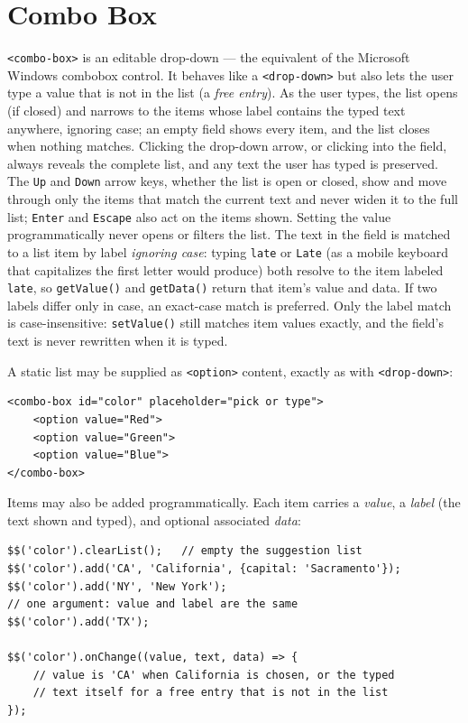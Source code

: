 \section{Combo Box}
\label{sec:comp-combobox}

\texttt{<combo-box>} is an editable drop-down --- the equivalent of the Microsoft Windows combobox control.  It behaves like a \texttt{<drop-down>} but also lets the user type a value that is not in the list (a \emph{free entry}).  As the user types, the list opens (if closed) and narrows to the items whose label contains the typed text anywhere, ignoring case; an empty field shows every item, and the list closes when nothing matches.  Clicking the drop-down arrow, or clicking into the field, always reveals the complete list, and any text the user has typed is preserved.  The \texttt{Up} and \texttt{Down} arrow keys, whether the list is open or closed, show and move through only the items that match the current text and never widen it to the full list; \texttt{Enter} and \texttt{Escape} also act on the items shown.  Setting the value programmatically never opens or filters the list.  The text in the field is matched to a list item by label \emph{ignoring case}: typing \texttt{late} or \texttt{Late} (as a mobile keyboard that capitalizes the first letter would produce) both resolve to the item labeled \texttt{late}, so \texttt{getValue()} and \texttt{getData()} return that item's value and data.  If two labels differ only in case, an exact-case match is preferred.  Only the label match is case-insensitive: \texttt{setValue()} still matches item values exactly, and the field's text is never rewritten when it is typed.

A static list may be supplied as \texttt{<option>} content, exactly as with \texttt{<drop-down>}:

\begin{lstlisting}[style=html]
<combo-box id="color" placeholder="pick or type">
    <option value="Red">
    <option value="Green">
    <option value="Blue">
</combo-box>
\end{lstlisting}

\noindent
Items may also be added programmatically.  Each item carries a \emph{value}, a \emph{label} (the text shown and typed), and optional associated \emph{data}:

\begin{lstlisting}[style=javascript]
$$('color').clearList();   // empty the suggestion list
$$('color').add('CA', 'California', {capital: 'Sacramento'});
$$('color').add('NY', 'New York');
// one argument: value and label are the same
$$('color').add('TX');

$$('color').onChange((value, text, data) => {
    // value is 'CA' when California is chosen, or the typed
    // text itself for a free entry that is not in the list
});
\end{lstlisting}

